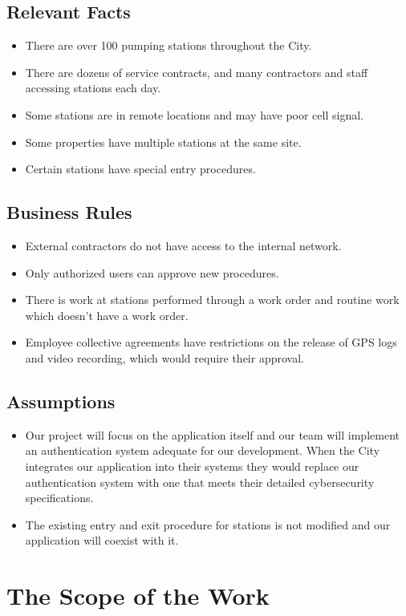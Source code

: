 \documentclass[12pt]{article}
\begin{document}
\subsection{Relevant Facts}
\begin{itemize}
  \item There are over 100 pumping stations throughout the City.
  \item There are dozens of service contracts, and many contractors
    and staff accessing stations each day.
  \item Some stations are in remote locations and may have poor cell signal.
  \item Some properties have multiple stations at the same site.
  \item Certain stations have special entry procedures.
\end{itemize}

\subsection{Business Rules}
\begin{itemize}
  \item External contractors do not have access to the internal network.
  \item Only authorized users can approve new procedures.
  \item There is work at stations performed through a work order
    and routine work which doesn't have a work order.
  \item Employee collective agreements have restrictions on the release of
    GPS logs and video recording, which would require their approval.
\end{itemize}
\subsection{Assumptions}
\begin{itemize}
  \item Our project will focus on the application itself
    and our team will implement an authentication system adequate for our
    development. When the City integrates our application into their systems
    they would replace our authentication system with one that meets their
    detailed cybersecurity specifications.
  \item The existing entry and exit procedure for stations is not modified
    and our application will coexist with it.
\end{itemize}
\section{The Scope of the Work}
\end{document}
